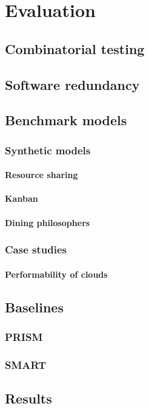 \chapter{Evaluation}
\label{chap:evaluation}

\section{Combinatorial testing}

\section{Software redundancy}

\section{Benchmark models}

\subsection{Synthetic models}

\subsubsection{Resource sharing}

\subsubsection{Kanban}

\subsubsection{Dining philosophers}

\subsection{Case studies}

\subsubsection{Performability of clouds}

\section{Baselines}

\subsection{PRISM}

\subsection{SMART}

\section{Results}